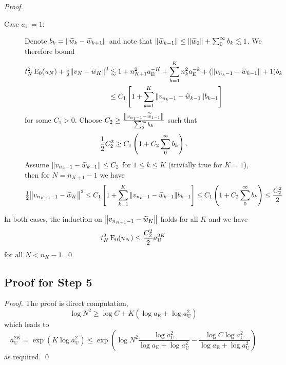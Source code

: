 \documentclass[smallextended]{svjour3}
\newcommand{\norm}[1]{{\left\lVert #1 \right\rVert}}
\newcommand{\op}[1]{\operatorname{#1}}
\newcommand{\1}{\F{1}}
\newcommand{\aU}{a_{\op{U}}}\newcommand{\aE}{a_{\op{E}}}
\newcommand*{\var}[1]{%
	\IfEqCase{#1}{%
		{0}{u}%
		{1}{v}%
		{2}{w}%
	}[u#1]%
}
\newcommand*{\vars}[1]{%
	\IfEqCase{#1}{%
		{0}{\alpha}%
		{1}{\beta}%
		{2}{\gamma}%
		{3}{a}%
		{4}{b}%
		{5}{c}%
	}[k#1]%
}
\begin{document}
\begin{proof}
\begin{description}
			\item[Case $\aU=1$:] Denote $\vars4_k = \norm{\tilde{\var2}_k-\tilde{\var2}_{k+1}}$ and note that $\norm{\tilde{\var2}_{k-1}} \leq \norm{\tilde{\var2}_{0}} + \sum_0^\infty \vars4_k\lesssim 1$. We therefore bound
			\begin{align}
				t_N^2\op{E}_0(\var0_N) + \tfrac12\norm{\var1_N-\tilde{\var2}_K}^2 &\lesssim 1 + n_{K+1}^2\aE^{-K} + \sum_{k=1}^{K}n_k^2\aE^{-k} + (\norm{\var1_{n_k-1}-\tilde{\var2}_{k-1}} + 1)b_k
				\\&\leq C_1\left[1 + \sum_{k=1}^{K}\norm{\var1_{n_k-1}-\tilde{\var2}_{k-1}}\vars4_{k-1}\right]
			\end{align}
			for some $C_1>0$. Choose $C_2\geq \frac{\norm{\var1_{n_1-1}-\tilde{\var2}_{1-1}}}{\sum_0^\infty \vars4_k}$ such that 
			\begin{equation}
				\frac12C_2^2 \geq C_1\left(1+C_2\sum_0^\infty\vars4_k\right).
			\end{equation}
			Assume $\norm{\var1_{n_k-1}-\tilde{\var2}_{k-1}}\leq C_2$ for $1\leq k\leq K$ (trivially true for $K=1$), then for $N=n_{K+1}-1$ we have 
			\begin{equation}
				\tfrac12\norm{\var1_{n_{K+1}-1}-\tilde{\var2}_K}^2 \leq C_1\left[1 + \sum_{k=1}^{K}\norm{\var1_{n_k-1}-\tilde{\var2}_{k-1}}\vars4_{k-1}\right]
				\leq C_1\left(1+C_2\sum_0^\infty\vars4_k\right) \leq \frac{C_2^2}{2}
			\end{equation}
		\end{description}
		In both cases, the induction on $\norm{\var1_{n_{K+1}-1}-\tilde{\var2}_K}$ holds for all $K$ and we have 
		\begin{equation}
			t_N^2\op{E}_0(\var0_N) \leq \frac{C_2^2}{2}\aU^{2K}
		\end{equation}
		for all $N<n_K-1$.
		\qed\end{proof}
	
	\subsection{Proof for Step 5}
	\begin{lemma}\label{app:thm: sufficiently slow}
	\end{lemma}
	\begin{proof}
		The proof is direct computation,
		\begin{equation}
			\log N^2 \geq \log C + K\left(\log \aE + \log \aU^2\right)
		\end{equation}
		which leads to
		\begin{equation}
			\aU^{2K} = \exp(K\log \aU^2)
			\leq \exp\left(\log N^2\frac{\log \aU^2}{\log \aE + \log \aU^2} - \frac{\log C\log \aU^2}{\log \aE + \log \aU^2}\right)
		\end{equation}
		as required.
		\qed\end{proof}
	
\end{document}
